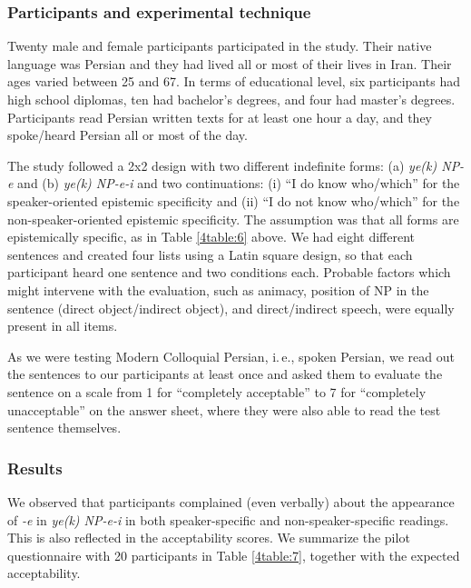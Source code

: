 \documentclass[output=paper]{langsci/langscibook}
\begin{document}
\subsubsection{Participants and experimental technique}\label{4sec:511}

Twenty male and female participants participated in the study. Their native language was Persian and they had lived all or most of their lives in Iran. Their ages varied between 25 and 67. In terms of educational level, six participants had high school diplomas, ten had bachelor's degrees, and four had master's degrees. Participants read Persian written texts for at least one hour a day, and they spoke/heard Persian all or most of the day.

{
The study followed a 2x2 design with two different indefinite forms: (a) {\emph{ye(k) NP-e}} and (b) {\emph{ye(k) NP-e-i}} and two continuations: (i) ``I do know who/which'' for the speaker-oriented epistemic specificity and (ii) ``I do not know who/which'' for the non-speaker-oriented epistemic specificity. The assumption was that all forms are epistemically specific, as in Table \ref{4table:6} above. We had eight different sentences and created four lists using a Latin square design, so that each participant heard one sentence and two conditions each. Probable factors which might intervene with the evaluation, such as animacy, position of NP in the sentence (direct object/indirect object), and direct/indirect speech, were equally present in all items. 
}

As we were testing Modern Colloquial Persian, i.\,e., spoken Persian, we read out the sentences to our participants at least once and asked them to evaluate the sentence on a scale from 1 for ``completely acceptable'' to 7 for ``completely unacceptable'' on the answer sheet, where they were also able to read the test sentence themselves.


\subsubsection{Results}\label{4sec:512}

We observed that participants complained (even verbally) about the appearance of {\emph{-e}} in {\emph{ye(k) NP-e-i}} in both speaker-specific and non-speaker-specific readings. This is also reflected in the acceptability scores. We summarize the pilot questionnaire with 20 participants in Table \ref{4table:7}, together with the expected acceptability.
\end{document}
